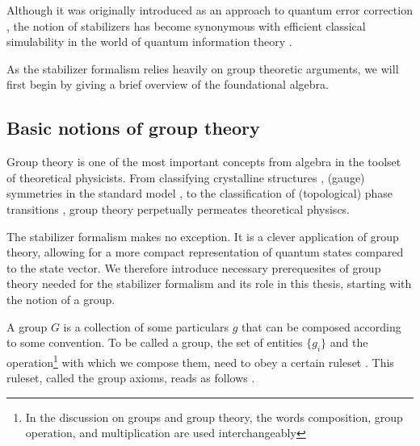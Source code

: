 Although it was originally introduced as an approach to quantum error
correction
\cite{nielsenQuantumComputationQuantum2010,gottesmanStabilizerCodesQuantum1997,gottesmanClassQuantumErrorcorrecting1996,gottesmanSurvivingQuantumComputer2024}, the notion of
stabilizers has become synonymous with efficient classical simulability in the
world of quantum information theory
\cite{nielsenQuantumComputationQuantum2010,aaronsonImprovedSimulationStabilizer2004,aaronsonIntroductionQuantumInformation,aaronsonIntroductionQuantumInformationa,fisherRandomQuantumCircuits2023}.

As the stabilizer formalism relies heavily on group theoretic arguments, we
will first begin by giving a brief overview of the foundational algebra.
\subsection{Basic notions of group theory}\label{sec:grouptheory}
Group theory is one of the most important concepts from algebra in the toolset
of theoretical physicists.  From classifying crystalline structures
\cite{ashcroftSolidStatePhysics1978}, (gauge) symmetries in the standard model
\cite{yangConservationIsotopicSpin1954}, to the classification of (topological)
phase transitions \cite{landauTheoryPhaseTransitions1936,langLectureNotesTopological2021}, group theory
perpetually permeates theoretical physiscs.

The stabilizer formalism makes no exception. It is a clever application of
group theory, allowing for a more compact representation of quantum states
compared to the state vector. We therefore introduce necessary prerequesites of
group theory needed for the stabilizer formalism and its role in this thesis,
starting with the notion of a group.

A group $G$ is a collection of some particulars $g$ that can be composed
according to some convention. To be called a group, the set of entities
$\{g_i\}$ and the operation\footnote{In the discussion on groups and group
  theory, the words composition, group operation, and multiplication are used
interchangeably} with which we compose them, need to obey a certain
ruleset \cite{zeeGroupTheoryNutshell2016}. This ruleset, called the group axioms, reads as follows
\cite{stroppelHoehereMathematik12023}.

